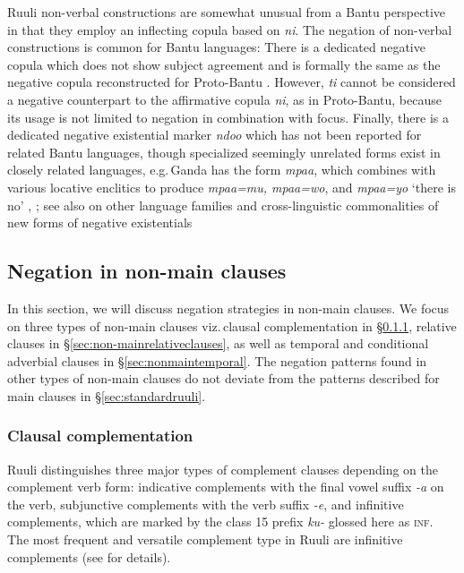 \documentclass[output=paper,colorlinks,citecolor=brown,draftmode]{langscibook}
\begin{document}
Ruuli non-verbal constructions are somewhat unusual from a Bantu perspective in that they employ an inflecting copula based on \textit{ni}. 
The negation of non-verbal constructions is common for Bantu languages: 
There is a dedicated negative copula which does not show subject agreement and is formally the same as the negative copula reconstructed for Proto-Bantu \citep[115]{Meeussen1967}. 
However, \textit{ti} cannot be considered a negative counterpart to the affirmative copula \textit{ni}, as in Proto-Bantu, because its usage is not limited to negation in combination with focus. 
Finally, there is a dedicated negative existential marker \textit{ndoo} which has not been reported for related Bantu languages, though specialized seemingly unrelated forms exist in closely related languages, e.g.\,Ganda has the form \emph{mpaa}, which combines with various locative enclitics to produce \textit{mpaa=mu, mpaa=wo}, and \textit{mpaa=yo} `there is no' \citep{AshtonEtAl1954}, \citep[341]{Murphy1972}; see also \citet{Veselinova2016} on other language families and cross-linguistic commonalities of new forms of negative existentials


\subsection{Negation in non-main clauses} \label{sec:non-mainruuli}\label{sec:ruulietal:2.4}

In this section, we will discuss negation strategies in non-main clauses. 
We focus on three types of non-main clauses viz.\,clausal complementation in §\ref{sec:non-mainruulicompl}, relative clauses in §\ref{sec:non-mainrelativeclauses}, as well as temporal and conditional adverbial clauses in  §\ref{sec:nonmaintemporal}. 
The negation patterns found in other types of non-main clauses do not deviate from the patterns described for main clauses in §\ref{sec:standardruuli}.


\subsubsection{Clausal complementation}\label{sec:non-mainruulicompl}\label{sec:ruulietal:2.4.1}

Ruuli distinguishes three major types of complement clauses depending on the complement verb form: indicative complements with the final vowel suffix \textit{-a} on the verb, 
subjunctive complements with the verb suffix \textit{-e}, 
and infinitive complements, which are marked by the class 15 prefix \textit{ku-} glossed here as \textsc{inf}. 
The most frequent and versatile complement type in Ruuli are infinitive complements (see \citealt{SorensenWitzlack-Makarevich2020} for details). 
\end{document}
